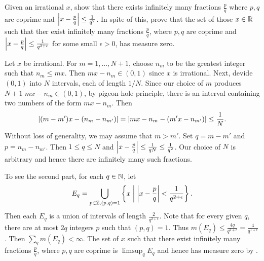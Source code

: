 \begin{problem}
    Given an irrational $x$, show that there exists infinitely 
    many fractions $\frac{p}{q}$ where $p,q$ are coprime and 
    $\left\lvert {x-\frac{p}{q}} \right\rvert\leq\frac{1}{q^2}$. In spite of this, 
    prove that the set of those $x\in\mathbb{R}$ such that ther exist 
    infinitely many fractions $\frac{p}{q}$, where $p,q$ are 
    coprime and $\left\lvert {x-\frac{p}{q}} \right\rvert\leq
    \frac{1}{q^{2+\epsilon}}$ for some small $\epsilon>0$, 
    has measure zero.
\end{problem}
\begin{pf}
    Let $x$ be irrational. For $m=1,\ldots,N+1$, choose $n_m$ 
    to be the greatest integer such that $n_m\leq mx$. Then 
    $mx-n_m\in(0,1)$ since $x$ is irrational. Next, devide 
    $(0,1)$ into $N$ intervals, each of length $1/N$. Since 
    our choice of $m$ produces $N+1$ $mx-n_m\in(0,1)$, by 
    pigeon-hole principle, there is an interval containing 
    two numbers of the form $mx-n_m$. Then 
    \[
        \left\lvert {(m-m')x-(n_m-n_{m'})} \right\rvert 
        = \left\lvert {mx-n_m-(m'x-n_{m'})} \right\rvert 
        \leq \frac{1}{N}.
    \] 
    Without loss of generality, we may assume that $m>m'$. 
    Set $q = m-m'$ and $p = n_m-n_{m'}$. Then $1\leq q\leq N$ 
    and $\left\lvert {x-\frac{p}{q}} \right\rvert\leq\frac{1}{qN}\leq\frac{1}{q^2}$. 
    Our choice of $N$ is arbitrary and hence there are 
    infinitely many such fractions. 

    To see the second part, for each $q\in\mathbb{N}$, let 
    \[
        E_q = \bigcup_{p\in\mathbb{Z}, (p,q)=1} 
        \left\{ x \;\middle\vert\; \left\lvert {x-\frac{p}{q}} \right\rvert<\frac{1}{q^{2+\epsilon}} \right\}. 
    \]
    Then each $E_q$ is a union of intervals of length 
    $\frac{2}{q^{2+\epsilon}}$. Note that for every given $q$, 
    there are at most $2q$ integers $p$ such that $(p,q)=1$. 
    Thus $m(E_q)\leq \frac{4q}{q^{2+\epsilon}} 
    = \frac{4}{q^{1+\epsilon}}$. Then $\sum_q m(E_q) < \infty$. 
    The set of $x$ such that there exist infinitely many 
    fractions $\frac{p}{q}$, where $p,q$ are coprime is 
    $\limsup_q E_q$ and hence has measure zero by 
    .
\end{pf}

